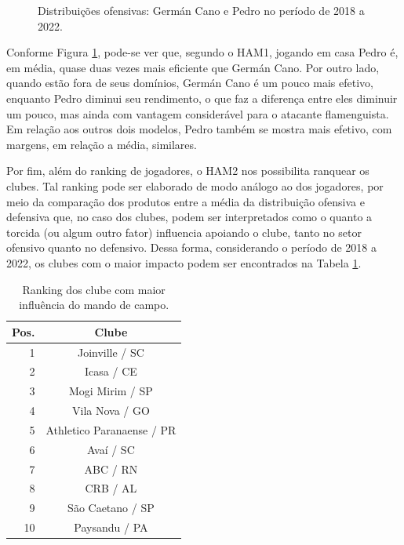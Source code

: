 \begin{figure}[H]
    \caption{Distribuições ofensivas: Germán Cano e Pedro no período de 2018 a 2022.}
    \label{plots3}
\end{figure}

Conforme Figura \ref{plots3}, pode-se ver que, segundo o HAM1, jogando em casa Pedro é, em média, quase duas vezes mais eficiente que Germán Cano. Por outro lado, quando estão fora de seus domínios, Germán Cano é um pouco mais efetivo, enquanto Pedro diminui seu rendimento, o que faz a diferença entre eles diminuir um pouco, mas ainda com vantagem considerável para o atacante flamenguista. Em relação aos outros dois modelos, Pedro também se mostra mais efetivo, com margens, em relação a média, similares.

Por fim, além do ranking de jogadores, o HAM2 nos possibilita ranquear os clubes. Tal ranking pode ser elaborado de modo análogo ao dos jogadores, por meio da comparação dos produtos entre a média da distribuição ofensiva e defensiva que, no caso dos clubes, podem ser interpretados como o quanto a torcida (ou algum outro fator) influencia apoiando o clube, tanto no setor ofensivo quanto no defensivo. Dessa forma, considerando o período de 2018 a 2022, os clubes com o maior impacto podem ser encontrados na Tabela \ref{rankig_clubs}.
\begin{table}[H]
    \centering
    \begin{tabular}{r|c}
        \hline
        Pos. & Clube \\ \hline
           1 &            Joinville / SC \\
           2 &                Icasa / CE \\
           3 &           Mogi Mirim / SP \\
           4 &            Vila Nova / GO \\
           5 & Athletico Paranaense / PR \\
           6 &                 Avaí / SC \\
           7 &                  ABC / RN \\
           8 &                  CRB / AL \\
           9 &          São Caetano / SP \\
          10 &             Paysandu / PA \\ \hline
    \end{tabular}
    \caption{Ranking dos clube com maior influência do mando de campo.}
    \label{rankig_clubs}
\end{table}

